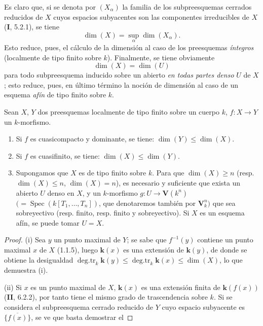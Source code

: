 Es claro que, si se denota por $(X_\alpha)$ la familia de los subpreesquemas
cerrados reducidos de $X$ cuyos espacios subyacentes son las componentes
irreducibles de $X$ (\textbf I, 5.2.1), se tiene
\begin{equation}
\tag{4.1.1.2}
\label{IV.2.4.1.1.2-fr}
\dim(X)=\sup_\alpha\dim(X_\alpha).
\end{equation}
Esto reduce, pues, el cálculo de la dimensión al caso de los preesquemas
\emph{íntegros} (localmente de tipo finito sobre $k$). Finalmente, se tiene
obviamente
\begin{equation}
\tag{4.1.1.3}
\label{IV.2.4.1.1.3-fr}
\dim(X)=\dim(U)
\end{equation}
para todo subpreesquema inducido sobre un abierto \emph{en todas partes denso}
$U$ de $X$; esto reduce, pues, en último término la noción de dimensión al
caso de un esquema \emph{afín} de tipo finito sobre $k$.

\begin{theorem}[4.1.2]
\label{IV.2.4.1.2-fr}
Sean $X$, $Y$ dos preesquemas localmente de tipo finito sobre un cuerpo $k$,
$f:X\to Y$ un $k$-morfismo.


\begin{enumerate}
\item[\textup{(i)}] Si $f$ es cuasicompacto y dominante, se tiene:
$\dim(Y)\leqslant\dim(X)$.
\item[\textup{(ii)}] Si $f$ es cuasifinito, se tiene:
$\dim(X)\leqslant\dim(Y)$.
\item[\textup{(iii)}] Supongamos que $X$ es de tipo finito sobre $k$. Para que
$\dim(X)\geqslant n$ \textup{(resp. $\dim(X)\leqslant n$, $\dim(X)=n$)}, es necesario y
suficiente que exista un abierto $U$ denso en $X$, y un $k$-morfismo
$g:U\longrightarrow\mathbf V(k^n)$
$(=\operatorname{Spec}(k[T_1,\ldots,T_n])$,
que denotaremos también por $\mathbf V_k^n)$ que sea sobreyectivo \textup{(resp.} finito,
\textup{resp.} finito y sobreyectivo\textup{)}. Si $X$ es un esquema afín, se puede tomar $U=X$.
\end{enumerate}
\end{theorem}

\begin{proof}
(i) Sea $y$ un punto maximal de $Y$; se sabe que $f^{-1}(y)$ contiene un
punto maximal $x$ de $X$ (1.1.5), luego $\boldsymbol{k}(x)$ es una extensión de $\boldsymbol{k}(y)$,
de donde se obtiene la desigualdad
$\operatorname{deg.tr}_k \boldsymbol{k}(y)
\leqslant\operatorname{deg.tr}_k \boldsymbol{k}(x)
\leqslant\dim(X)$,
lo que demuestra (i).

(ii) Si $x$ es un punto maximal de $X$, $\boldsymbol{k}(x)$ es una extensión finita de
$\boldsymbol{k}(f(x))$ (\textbf{II}, 6.2.2), por tanto tiene el mismo grado de trascendencia sobre
$k$. Si se considera el subpreesquema cerrado reducido de $Y$ cuyo espacio
subyacente es $\overline{\{f(x)\}}$, se ve que basta demostrar el
\end{proof}

